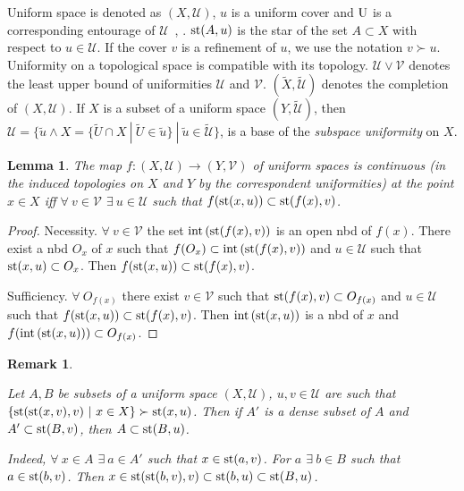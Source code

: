 \documentclass{amsart}
\newtheorem{lem}[thm]{Lemma}
\newtheorem{rem}[thm]{Remark}
\newcommand{\Int}{\mbox{{\rm int}}\,}
\newcommand{\st}{\mbox{{\rm st}}}
\begin{document}
Uniform space is denoted as $(X, \mathcal U)$, $u$ is a uniform cover and ${\rm U}$ is a corresponding entourage of $\mathcal U$~\cite{Isbell}, \cite{Engelking}. $\st (A, u)$ is the star of the set $A\subset X$ with respect to $u\in\mathcal U$. If the cover $v$ is a refinement of  $u$, we use the notation $v\succ u$. Uniformity on a topological space is compatible with its topology. $\mathcal U\vee\mathcal V$ denotes the least upper bound of uniformities $\mathcal U$ and $\mathcal V$. $(\tilde X, \tilde{\mathcal U})$ denotes the completion of $(X, \mathcal U)$. If $X$ is a subset of a uniform space $(Y, \tilde{\mathcal U})$, then $\mathcal U=\{\tilde u\wedge X=\{\tilde U\cap X\ |\ \tilde U\in\tilde u\}\ |\ \tilde u\in\tilde{\mathcal U}\}$, is a base of the {\it subspace uniformity} on $X$.

\begin{lem}\label{cont}
The map $f: (X, \mathcal U)\to (Y, \mathcal V)$ of uniform spaces is continuous {\rm(}in the induced topologies on $X$ and $Y$ by the correspondent uniformities{\rm)} at the point $x\in X$ iff $\forall\ v\in\mathcal V$  $\exists\ u\in\mathcal U$ such that $f(\st (x, u))\subset \st (f(x), v)$. 
\end{lem}

\begin{proof} 
Necessity. $\forall\ v\in\mathcal V$  the set $\Int (\st (f(x), v))$ is an open nbd of $f(x)$. There exist a nbd $O_x$ of $x$ such that $f(O_x)\subset\Int (\st (f(x), v))$ and $u\in\mathcal U$ such that $\st (x, u)\subset O_x$. Then $f(\st (x, u))\subset \st (f(x), v)$. 

Sufficiency. $\forall\ O_{f(x)}$ there exist $v\in\mathcal V$ such that $\st (f(x), v)\subset O_{f(x)}$ and $u\in\mathcal U$ such that $f(\st (x, u))\subset \st (f(x), v)$. Then $\Int (\st (x, u))$ is a nbd of $x$ and $f(\Int (\st (x, u)))\subset  O_{f(x)}$.
\end{proof}

\begin{rem}\label{denseent}
{\rm Let $A, B$ be subsets of a uniform space $(X, \mathcal U)$, $u, v\in \mathcal U$ are such that $\{\st (\st (x, v), v)\ |\ x\in X\}\succ\st (x, u)$. Then if $A'$ is a dense subset of $A$ and $A'\subset\st (B, v)$, then $A\subset\st (B, u)$. 

Indeed, $\forall\ x\in A$ $\exists\ a\in A'$ such that $x\in\st (a, v)$. For $a$ $\exists\ b\in B$ such that $a\in\st (b, v)$. Then $x\in\st (\st (b, v), v)\subset\st (b, u)\subset\st (B, u)$. }
\end{rem}
\end{document}
